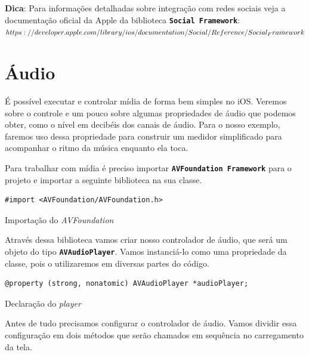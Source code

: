 \documentclass[a4paper,12pt,brazil,oneside]{book}
\begin{document}
\begin{framed}

\textbf{Dica}: Para informações detalhadas sobre integração com redes sociais veja a documentação oficial da Apple da biblioteca \texttt{\textbf{Social Framework}}:\\
\(https://developer.apple.com/library/ios/documentation/Social/Reference/\\Social_Framework\)
\end{framed}

\section{Áudio}


É possível executar e controlar mídia de forma bem simples no iOS. Veremos sobre o controle e um pouco sobre algumas propriedades de áudio que podemos obter, como o nível em decibéis dos canais de áudio. Para o nosso exemplo, faremos uso dessa propriedade para construir um medidor simplificado para acompanhar o ritmo da música enquanto ela toca.

Para trabalhar com mídia é preciso importar \texttt{\textbf{AVFoundation Framework}} para o projeto e importar a seguinte biblioteca na sua classe.

\begin{listing}[H]
\begin{verbatim}
#import <AVFoundation/AVFoundation.h>
\end{verbatim}
\caption{Importação do \emph{AVFoundation}}
\end{listing}


Através dessa biblioteca vamos criar nosso controlador de áudio, que será um objeto do tipo \texttt{\textbf{AVAudioPlayer}}. Vamos instanciá-lo como uma propriedade da classe, pois o utilizaremos em diversas partes do código.

\begin{listing}[H]
\begin{verbatim}
@property (strong, nonatomic) AVAudioPlayer *audioPlayer;
\end{verbatim}
\caption{Declaração do \emph{player}}
\end{listing}


Antes de tudo precisamos configurar o controlador de áudio. Vamos dividir essa configuração em dois métodos que serão chamados em sequência no carregamento da tela.
\end{document}

